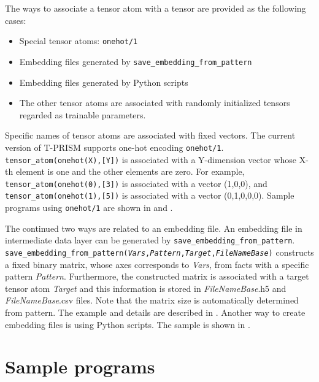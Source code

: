 \documentclass[a4paper]{report}
\begin{document}
The ways to associate a tensor atom with a tensor are provided as the following cases:
\begin{itemize}
 \item Special tensor atoms: {\tt onehot/1}
 \item Embedding files generated by {\tt save\_embedding\_from\_pattern}
 \item Embedding files generated by Python scripts 
 \item The other tensor atoms are associated with randomly initialized tensors regarded as trainable parameters.
\end{itemize}

Specific names of tensor atoms are associated with fixed vectors.
The current version of T-PRISM supports one-hot encoding {\tt onehot/1}.
{\tt tensor\_atom(onehot(X),[Y])} is associated with a Y-dimension vector whose X-th element is one and the other elements are zero.
For example,
{\tt tensor\_atom(onehot(0),[3])} is associated with a vector (1,0,0),
and {\tt tensor\_atom(onehot(1),[5])} is associated with a vector (0,1,0,0,0).
Sample programs using {\tt onehot/1} are shown in  and .

The continued two ways are related to an embedding file.
An embedding file in intermediate data layer can be generated by {\tt save\_embedding\_from\_pattern}.
{\tt save\_embedding\_from\_pattern({\it Vars},{\it Pattern},{\it Target},{\it FileNameBase})}
constructs a fixed binary matrix, whose axes corresponds to {\it Vars}, from facts with a specific pattern {\it Pattern}. Furthermore, the constructed matrix is associated with a target tensor atom {\it Target} and this information is stored in {\it FileNameBase}.h5 and {\it FileNameBase}.csv files.
Note that the matrix size is automatically determined from pattern.
The example and details are described in .
Another way to create embedding files is using Python scripts.
The sample is shown in .



\chapter{Sample programs}
\label{chap:tprism_sample}
\end{document}
